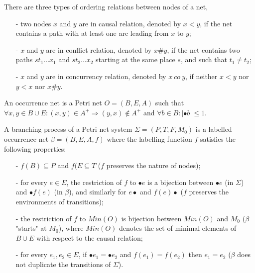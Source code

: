 \documentclass{llncs}
\begin{document}
\begin{definition}\label{def:orderingRelations}
There are three types of ordering relations between nodes of a net,
	\begin{itemize}
		\item[-] two nodes $x$ and $y$ are in causal relation, denoted by $x<y$, if the net contains a path with at least one arc leading from $x$ to $y$;
		\item[-] $x$ and $y$ are in conflict relation, denoted by $x\#y$, if the net contains two paths $st_{1}...x_{1}$ and $st_{2}...x_{2}$ starting at the same place $s$, and such that $t_{1}\neq t_{2}$;
		\item[-] $x$ and $y$ are in concurrency relation, denoted by $x~co~y$, if neither $x<y$ nor $y<x$ nor $x\#y$.
	\end{itemize}
\end{definition}

\begin{definition}\label{def:occurrenceNet}
An occurrence net is a Petri net $O=(B,E,A)$ such that $\forall x,y\in B\cup E:(x,y)
\in A^{+}\Rightarrow(y,x)\notin A^{+}$ and $\forall b\in B:|\bullet b|\leq 1$.
\end{definition}

\begin{definition}\label{def:branchingProcess}
A branching process of a Petri net system $\Sigma=(P,T,F,M_{0})$ is a labelled occurrence net $\beta=(B,E,A,f)$ where the labelling function $f$ satisfies the following properties:
	\begin{itemize}
		\item[-] $f(B)\subseteq P$ and $f(E\subseteq T$ ($f$ preserves the nature of nodes);
		\item[-] for every $e\in E$, the restriction of $f$ to $\bullet e$ is a bijection between $\bullet e$ (in $\Sigma$) and $\bullet f(e)$ (in $\beta$), and similarly for $e\bullet$ and $f(e)\bullet$ ($f$ preserves the environments of transitions);
		\item[-] the restriction of $f$ to $Min(O)$ is bijection between $Min(O)$ and $M_{0}$ ($\beta$ "starts" at $M_{0}$), where $Min(O)$ denotes the set of minimal elements of $B\cup E$ with respect to the causal relation;
		\item[-] for every $e_{1},e_{2}\in E$, if $\bullet e_{1}=\bullet e_{2}$ and $f(e_{1})=f(e_{2})$ then $e_{1}=e_{2}$ ($\beta$ does not duplicate the transitions of $\Sigma$).
	\end{itemize}
\end{definition}
\end{document}
